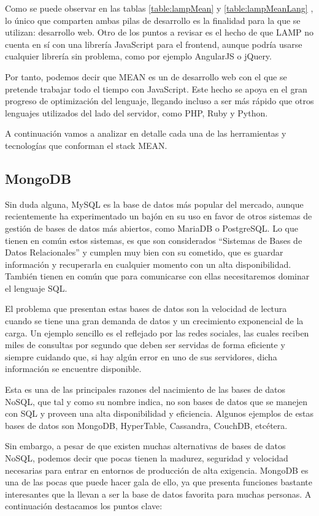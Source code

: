 Como se puede observar en las tablas \ref{table:lampMean} y \ref{table:lampMeanLang} , lo único que comparten ambas pilas de desarrollo es la finalidad para la que se utilizan: desarrollo web. Otro de los puntos a revisar es el hecho de que LAMP no cuenta en sí con una librería JavaScript para el frontend, aunque podría usarse cualquier librería sin problema, como por ejemplo AngularJS o jQuery.

Por tanto, podemos decir que MEAN es un  de desarrollo web con el que se pretende trabajar todo el tiempo con JavaScript. Este hecho se apoya en el gran progreso de optimización del lenguaje, llegando incluso a ser más rápido que otros lenguajes utilizados del lado del servidor, como PHP, Ruby y Python. 

A continuación vamos a analizar en detalle cada una de las herramientas y tecnologías que conforman el stack MEAN.

\subsection{MongoDB}
Sin duda alguna, MySQL es la base de datos más popular del mercado, aunque recientemente ha experimentado un bajón en su uso en favor de otros sistemas de gestión de bases de datos más abiertos, como MariaDB o PostgreSQL. Lo que tienen en común estos sistemas, es que son considerados ``Sistemas de Bases de Datos Relacionales'' y cumplen muy bien con su cometido, que es guardar información y recuperarla en cualquier momento con un alta disponibilidad. También tienen en común que para comunicarse con ellas necesitaremos dominar el lenguaje SQL.

El problema que presentan estas bases de datos son la velocidad de lectura cuando se tiene una gran demanda de datos y un crecimiento exponencial de la carga. Un ejemplo sencillo es el reflejado por las redes sociales, las cuales reciben miles de consultas por segundo que deben ser servidas de forma eficiente y siempre cuidando que, si hay algún error en uno de sus servidores, dicha información se encuentre disponible. 

Esta es una de las principales razones del nacimiento de las bases de datos NoSQL, que tal y como su nombre indica, no son bases de datos que se manejen con SQL y proveen una alta disponibilidad y eficiencia. Algunos ejemplos de estas bases de datos son MongoDB, HyperTable, Cassandra, CouchDB, etcétera.

Sin embargo, a pesar de que existen muchas alternativas de bases de datos NoSQL, podemos decir que pocas tienen la madurez, seguridad y velocidad necesarias para entrar en entornos de producción de alta exigencia. MongoDB es una de las pocas que puede hacer gala de ello, ya que presenta funciones bastante interesantes que la llevan a ser la base de datos favorita para muchas personas. A continuación destacamos los puntos clave:

